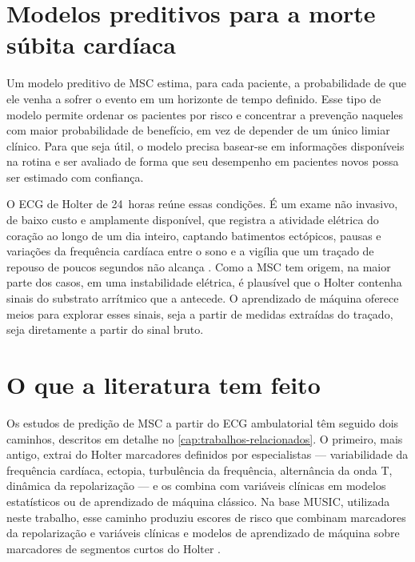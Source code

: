 \section{Modelos preditivos para a morte súbita cardíaca}
\label{sec:intro-modelos}

Um modelo preditivo de \gls{MSC} estima, para cada paciente, a probabilidade
de que ele venha a sofrer o evento em um horizonte de tempo definido. Esse
tipo de modelo permite ordenar os pacientes por risco e concentrar a
prevenção naqueles com maior probabilidade de benefício, em vez de
depender de um único limiar clínico. Para que seja útil, o modelo precisa
basear-se em informações disponíveis na rotina e ser avaliado de forma que
seu desempenho em pacientes novos possa ser estimado com confiança.

O \gls{ECG} de Holter de 24~horas reúne essas condições. É um exame não
invasivo, de baixo custo e amplamente disponível, que registra a atividade
elétrica do coração ao longo de um dia inteiro, captando batimentos
ectópicos, pausas e variações da frequência cardíaca entre o sono e a
vigília que um traçado de repouso de poucos segundos não alcança
\cite{steinberg2017ishne}. Como a
\gls{MSC} tem origem, na maior parte dos casos, em uma instabilidade elétrica,
é plausível que o Holter contenha sinais do substrato arrítmico que a
antecede. O aprendizado de máquina oferece meios para explorar esses sinais,
seja a partir de medidas extraídas do traçado, seja diretamente a partir do
sinal bruto.

\section{O que a literatura tem feito}
\label{sec:intro-literatura}

Os estudos de predição de \gls{MSC} a partir do \gls{ECG} ambulatorial têm
seguido dois caminhos, descritos em detalhe no
\autoref{cap:trabalhos-relacionados}. O primeiro, mais antigo, extrai do
Holter marcadores definidos por especialistas --- variabilidade da frequência
cardíaca, ectopia, turbulência da frequência, alternância da onda T,
dinâmica da repolarização --- e os combina com variáveis clínicas em modelos
estatísticos ou de aprendizado de máquina clássico. Na base \gls{MUSIC},
utilizada neste trabalho, esse caminho produziu escores de risco que
combinam marcadores da repolarização e variáveis clínicas
\cite{ramirez2017sudden} e modelos de aprendizado de máquina sobre
marcadores de segmentos curtos do Holter \cite{swee2026multimodal}.

